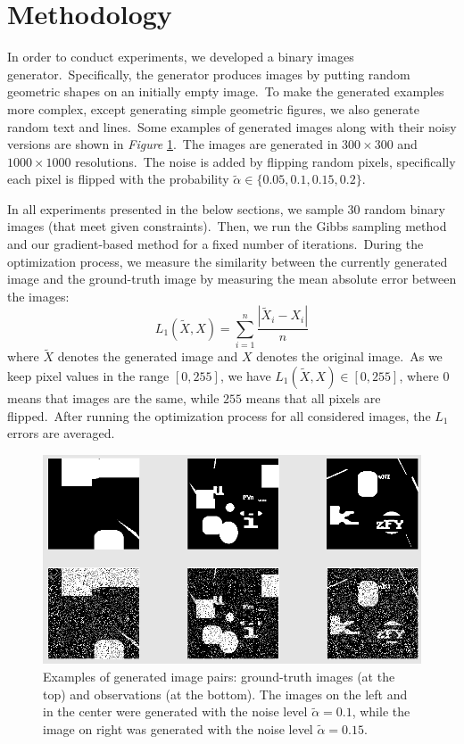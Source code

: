 \documentclass[a4paper, 11pt, onecolumn, openany, titlepage]{report}
\theoremstyle{default_theorem_style}\newtheorem{theorem}{Theorem}
\theoremstyle{default_theorem_style}\newtheorem{definition}{Definition}
\begin{document}
\section{Methodology}

In order to conduct experiments, we developed a binary images generator.\ Specifically, the generator produces
images by putting random geometric shapes on an initially empty image.\ To make the generated examples more complex,
except generating simple geometric figures, we also generate random text and lines.\ Some examples of
generated images along with their noisy versions are shown in \textit{Figure}
\ref{fig:binary_data_examples}.\ The images are generated in $300{\times}300$ and $1000{\times}1000$
resolutions.\ The noise is added by flipping random pixels, specifically each pixel is flipped with the probability
$\tilde{\alpha} \in \{0.05, 0.1, 0.15, 0.2\}$.\newline

In all experiments presented in the below sections, we sample 30 random binary images
(that meet given constraints).\ Then, we run the Gibbs sampling method and our gradient-based method for a
fixed number of iterations.\ During the optimization process, we measure the similarity between the currently
generated image and the ground-truth image by measuring the mean absolute error between the images:
$$
L_1(\tilde{X}, X) = \sum\limits_{i = 1}^n \frac{|\tilde{X}_i - X_i|}{n}
$$
where $\tilde{X}$ denotes the generated image and $X$ denotes the original image.\ As we keep pixel values in the
range $[0, 255]$, we have $L_1(\tilde{X}, X) \in [0, 255]$, where $0$ means that images are the same, while
$255$ means that all pixels are flipped.\ After running the optimization process for all considered images, the
$L_1$ errors are averaged.

\begin{figure}[H]
\centering
\includegraphics[scale=0.5]{binary_data_examples}
\caption{Examples of generated image pairs: ground-truth images (at the top) and observations (at the bottom).
The images on the left and in the center were generated with the noise level $\tilde{\alpha} = 0.1$, while the
image on right was generated with the noise level $\tilde{\alpha} = 0.15$.}
\label{fig:binary_data_examples}
\end{figure}
\end{document}
